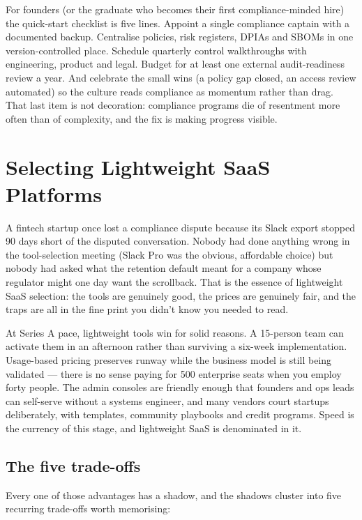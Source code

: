 For founders (or the graduate who becomes their first compliance-minded hire) the quick-start checklist is five lines. Appoint a single compliance captain with a documented backup. Centralise policies, risk registers, DPIAs and SBOMs in one version-controlled place. Schedule quarterly control walkthroughs with engineering, product and legal. Budget for at least one external audit-readiness review a year. And celebrate the small wins (a policy gap closed, an access review automated) so the culture reads compliance as momentum rather than drag. That last item is not decoration: compliance programs die of resentment more often than of complexity, and the fix is making progress visible.

\section{Selecting Lightweight SaaS Platforms}
A fintech startup once lost a compliance dispute because its Slack export stopped 90 days short of the disputed conversation. Nobody had done anything wrong in the tool-selection meeting (Slack Pro was the obvious, affordable choice) but nobody had asked what the retention default meant for a company whose regulator might one day want the scrollback. That is the essence of lightweight SaaS selection: the tools are genuinely good, the prices are genuinely fair, and the traps are all in the fine print you didn't know you needed to read.


At Series A pace, lightweight tools win for solid reasons. A 15-person team can activate them in an afternoon rather than surviving a six-week implementation. Usage-based pricing preserves runway while the business model is still being validated — there is no sense paying for 500 enterprise seats when you employ forty people. The admin consoles are friendly enough that founders and ops leads can self-serve without a systems engineer, and many vendors court startups deliberately, with templates, community playbooks and credit programs. Speed is the currency of this stage, and lightweight SaaS is denominated in it.



\subsection{The five trade-offs}


Every one of those advantages has a shadow, and the shadows cluster into five recurring trade-offs worth memorising:


